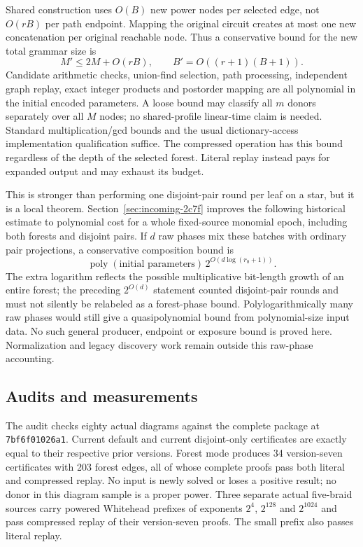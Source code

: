 Shared construction uses $O(B)$ new power nodes per selected edge, not
$O(rB)$ per path endpoint. Mapping the original circuit creates at most one
new concatenation per original reachable node. Thus a conservative bound
for the new total grammar size is
\[
 M'\le 2M+O(rB),\qquad B'=O((r+1)(B+1)).
\]
Candidate arithmetic checks, union-find selection, path processing,
independent graph replay, exact integer products and postorder mapping
are all polynomial in the initial encoded parameters. A loose bound may
classify all $m$ donors separately over all $M$ nodes; no shared-profile
linear-time claim is needed. Standard multiplication/gcd bounds and the
usual dictionary-access implementation qualification suffice. The compressed
operation has this bound regardless of the depth of the selected forest.
Literal replay instead pays for expanded output and may exhaust its budget.

This is stronger than performing one disjoint-pair round per leaf on a star,
but it is a local theorem. Section~\ref{sec:incoming-2c7f} improves the
following historical estimate to polynomial cost for a whole fixed-source
monomial epoch, including both forests and disjoint pairs. If $d$ raw phases mix these batches with ordinary
pair projections, a conservative composition bound is
\[
 \operatorname{poly}(\text{initial parameters})\,
       2^{O(d\log(r_0+1))}.
\]
The extra logarithm reflects the possible multiplicative bit-length growth
of an entire forest; the preceding $2^{O(d)}$ statement counted disjoint-pair
rounds and must not silently be relabeled as a forest-phase bound.
Polylogarithmically many raw phases would still give a quasipolynomial
bound from polynomial-size input data. No such general producer, endpoint
or exposure bound is proved here. Normalization and legacy discovery work
remain outside this raw-phase accounting.

\subsection{Audits and measurements}

The audit checks eighty actual diagrams against the complete package at \texttt{7bf6f01026a1}. Current default and current disjoint-only
certificates are exactly equal to their respective prior versions. Forest
mode produces 34 version-seven certificates with 203 forest edges, all of
whose complete proofs pass both literal and compressed replay. No input
is newly solved or loses a positive result; no donor in this diagram sample
is a proper power. Three separate actual five-braid sources carry powered
Whitehead prefixes of exponents $2^4$, $2^{128}$ and $2^{1024}$ and pass
compressed replay of their version-seven proofs. The small prefix also
passes literal replay.

